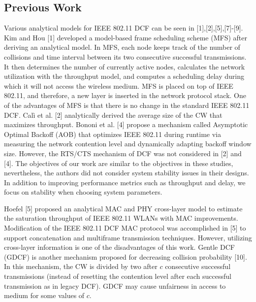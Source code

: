 \documentclass[10pt,twocolumn,oneside,submit]{JCNtran}
\begin{document}
\subsection{Previous Work}
Various analytical models for IEEE 802.11 DCF can be seen in [1],[2],[5],[7]-[9]. Kim and Hou [1] developed a model-based frame scheduling scheme (MFS) after deriving an analytical model. In MFS, each node keeps track of the number of collisions and time interval between its two consecutive successful transmissions. It then determines the number of currently active nodes, calculates the network utilization with the throughput model, and computes a scheduling delay during which it will not access the wireless medium. MFS is placed on top of IEEE 802.11, and therefore, a new layer is inserted in the network protocol stack. One of the advantages of MFS is that there is no change in the standard IEEE 802.11 DCF. Cal{\`i} et al. [2] analytically derived the average size of the CW that maximizes throughput. Bononi et al. [4] propose a mechanism called Asymptotic Optimal Backoff (AOB) that optimizes IEEE 802.11 during runtime via measuring the network contention level and dynamically adapting backoff window size. However, the RTS/CTS mechanism of DCF was not considered in [2] and [4]. The objectives of our work are similar to the objectives in these studies, nevertheless, the authors did not consider system stability issues in their designs. In addition to improving performance metrics such as throughput and delay, we focus on stability when choosing system parameters.

Hoefel [5] proposed an analytical MAC and PHY cross-layer model to estimate the saturation throughput of IEEE 802.11 WLANs with MAC improvements. Modification of the IEEE 802.11 DCF MAC protocol was accomplished in [5] to support concatenation and multiframe transmission techniques. However, utilizing cross-layer information is one of the disadvantages of this work. Gentle DCF (GDCF) is another mechanism proposed for decreasing collision probability [10]. In this mechanism, the CW is divided by two after $c$ consecutive successful transmissions (instead of resetting the contention level after each successful transmission as in legacy DCF). GDCF may cause unfairness in access to medium for some values of $c$.
\end{document}
